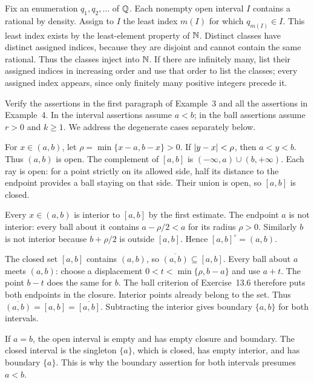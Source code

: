 Fix an enumeration $q_1,q_2,\ldots$ of $\mathbb{Q}$. Each nonempty
open interval $I$ contains a rational by density. Assign to $I$
the least index $m(I)$ for which $q_{m(I)}\in I$.
This least index exists by the least-element property of $\mathbb{N}$.
Distinct classes have distinct assigned indices, because they
are disjoint and cannot contain the same rational.
Thus the classes inject into $\mathbb{N}$. If there are infinitely
many, list their assigned indices in increasing order and use
that order to list the classes; every assigned index appears,
since only finitely many positive integers precede it.


\goal Verify the assertions in the first paragraph of Example~3
and all the assertions in Example~4. In the interval assertions
assume $a<b$; in the ball assertions assume $r>0$ and $k\ge1$.
We address the degenerate cases separately below.

For $x\in(a,b)$, let $\rho=\min\{x-a,b-x\}>0$.
If $\left|y-x\right|<\rho$, then $a<y<b$. Thus $(a,b)$ is open.
The complement of $[a,b]$ is
$(-\infty,a)\cup(b,+\infty)$. Each ray is open: for a point
strictly on its allowed side, half its distance to the endpoint
provides a ball staying on that side. Their union is open,
so $[a,b]$ is closed.

Every $x\in(a,b)$ is interior to $[a,b]$ by the first estimate.
The endpoint $a$ is not interior: every ball about it contains
$a-\rho/2<a$ for its radius $\rho>0$. Similarly $b$ is not
interior because $b+\rho/2$ is outside $[a,b]$.
Hence $[a,b]^\circ=(a,b)$.

The closed set $[a,b]$ contains $(a,b)$, so
$\overline{(a,b)}\subseteq[a,b]$. Every ball about $a$ meets
$(a,b)$: choose a displacement
$0<t<\min\{\rho,b-a\}$ and use $a+t$. The point $b-t$
does the same for $b$. The ball criterion of Exercise~13.6
therefore puts both endpoints in the closure. Interior points
already belong to the set. Thus
$\overline{(a,b)}=[a,b]=\overline{[a,b]}$.
Subtracting the interior gives boundary $\{a,b\}$ for both
intervals.

If $a=b$, the open interval is empty and has empty closure and
boundary. The closed interval is the singleton $\{a\}$, which
is closed, has empty interior, and has boundary $\{a\}$.
This is why the boundary assertion for both intervals presumes
$a<b$.

